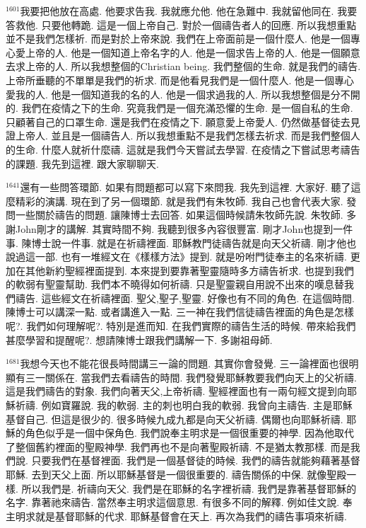 \documentclass{book}
\begin{document}
$^{1601}$我要把他放在高處.
他要求告我.
我就應允他.
他在急難中.
我就留他同在.
我要答救他.
只要他轉跪.
這是一個上帝自己.
對於一個禱告者人的回應.
所以我想重點並不是我們怎樣祈.
而是對於上帝來說.
我們在上帝面前是一個什麼人.
他是一個專心愛上帝的人.
他是一個知道上帝名字的人.
他是一個求告上帝的人.
他是一個願意去求上帝的人.
所以我想整個的Christian being.
我們整個的生命.
就是我們的禱告.
上帝所垂聽的不單單是我們的祈求.
而是他看見我們是一個什麼人.
他是一個專心愛我的人.
他是一個知道我的名的人.
他是一個求過我的人.
所以我想整個是分不開的.
我們在疫情之下的生命.
究竟我們是一個充滿恐懼的生命.
是一個自私的生命.
只顧著自己的口罩生命.
還是我們在疫情之下.
願意愛上帝愛人.
仍然做基督徒去見證上帝人.
並且是一個禱告人.
所以我想重點不是我們怎樣去祈求.
而是我們整個人的生命.
什麼人就祈什麼禱.
這就是我們今天嘗試去學習.
在疫情之下嘗試思考禱告的課題.
我先到這裡.
跟大家聊聊天.

$^{1641}$還有一些問答環節.
如果有問題都可以寫下來問我.
我先到這裡.
大家好.
聽了這麼精彩的演講.
現在到了另一個環節.
就是我們有朱牧師.
我自己也會代表大家.
發問一些關於禱告的問題.
讓陳博士去回答.
如果這個時候請朱牧師先說.
朱牧師.
多謝John剛才的講解.
其實時間不夠.
我聽到很多內容很豐富.
剛才John也提到一件事.
陳博士說一件事.
就是在祈禱裡面.
耶穌教門徒禱告就是向天父祈禱.
剛才他也說過這一部.
也有一堆經文在《樣樣方法》提到.
就是吩咐門徒奉主的名來祈禱.
更加在其他新約聖經裡面提到.
本來提到要靠著聖靈隨時多方禱告祈求.
也提到我們的軟弱有聖靈幫助.
我們本不曉得如何祈禱.
只是聖靈親自用說不出來的嘆息替我們禱告.
這些經文在祈禱裡面.
聖父,聖子,聖靈.
好像也有不同的角色.
在這個時間.
陳博士可以講深一點.
或者講進入一點.
三一神在我們信徒禱告裡面的角色是怎樣呢?.
我們如何理解呢?.
特別是進而知.
在我們實際的禱告生活的時候.
帶來給我們甚麼學習和提醒呢?.
想請陳博士跟我們講解一下.
多謝祖母師.

$^{1681}$我想今天也不能花很長時間講三一論的問題.
其實你會發覺.
三一論裡面也很明顯有三一關係在.
當我們去看禱告的時間.
我們發覺耶穌教要我們向天上的父祈禱.
這是我們禱告的對象.
我們向著天父,上帝祈禱.
聖經裡面也有一兩句經文提到向耶穌祈禱.
例如寶羅說.
我的軟弱.
主的刺也明白我的軟弱.
我曾向主禱告.
主是耶穌基督自己.
但這是很少的.
很多時候九成九都是向天父祈禱.
偶爾也向耶穌祈禱.
耶穌的角色似乎是一個中保角色.
我們說奉主明求是一個很重要的神學.
因為他取代了整個舊約裡面的聖殿神學.
我們再也不是向著聖殿祈禱.
不是猶太教那樣.
而是我們說.
只要我們在基督裡面.
我們是一個基督徒的時候.
我們的禱告就能夠藉著基督耶穌.
去到天父上面.
所以耶穌基督是一個很重要的.
禱告關係的中保.
就像聖殿一樣.
所以我們是.
祈禱向天父.
我們是在耶穌的名字裡祈禱.
我們是靠著基督耶穌的名字.
靠著祂來禱告.
當然奉主明求這個意思.
有很多不同的解釋.
例如佳文說.
奉主明求就是基督耶穌的代求.
耶穌基督會在天上.
再次為我們的禱告事項來祈禱.
\end{document}
